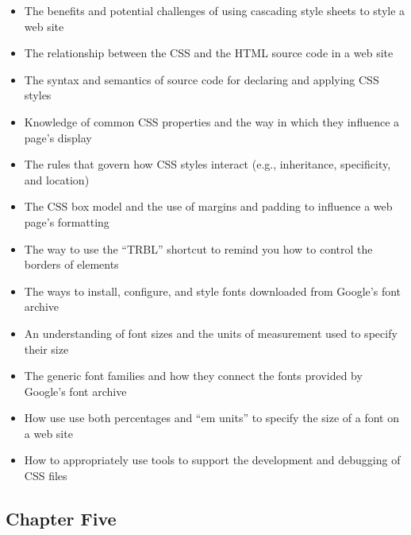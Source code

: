 \documentclass[11pt]{article}
\begin{document}
\begin{itemize}

  \itemsep 0.05in

  \item The benefits and potential challenges of using cascading style sheets to
    style a web site
  \item The relationship between the CSS and the HTML source code in a web site
  \item The syntax and semantics of source code for declaring and applying CSS
    styles
  \item Knowledge of common CSS properties and the way in which they influence
    a page's display
  \item The rules that govern how CSS styles interact (e.g., inheritance,
    specificity, and location)
  \item The CSS box model and the use of margins and padding to influence a web
    page's formatting
  \item The way to use the ``TRBL'' shortcut to remind you how to control the
    borders of elements
  \item The ways to install, configure, and style fonts downloaded from Google's
    font archive
  \item An understanding of font sizes and the units of measurement used to
    specify their size
  \item The generic font families and how they connect the fonts provided by
    Google's font archive
  \item How use use both percentages and ``em units'' to specify the size of a
    font on a web site
  \item How to appropriately use tools to support the development and
    debugging of CSS files

\end{itemize}

\vspace*{-.2in}
\subsection*{Chapter Five}
\end{document}
